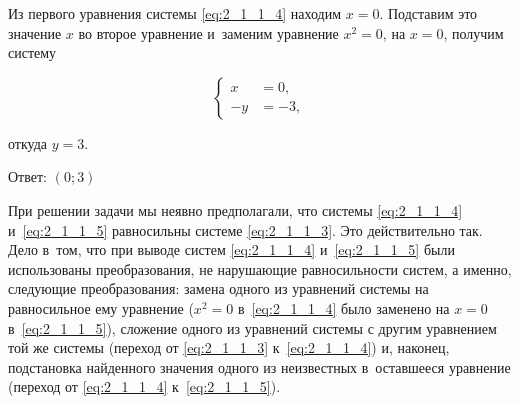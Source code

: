 Из первого уравнения системы \eqref{eq:2_1_1_4} находим $x = 0$.
Подставим это значение $x$ во второе уравнение и~заменим уравнение $x^{2} = 0$,
на $x = 0$, получим систему

\begin{equation}\label{eq:2_1_1_5}
\begin{cases}
x &= 0, \\
-y &= -3,
\end{cases}
\end{equation}

откуда $y = 3$.

Ответ: $(0; 3)$

При решении задачи мы неявно предполагали,
что системы \eqref{eq:2_1_1_4} и~\eqref{eq:2_1_1_5}
равносильны системе \eqref{eq:2_1_1_3}.
Это действительно так. Дело в~том, что при выводе систем
\eqref{eq:2_1_1_4} и~\eqref{eq:2_1_1_5} были использованы преобразования,
не нарушающие равносильности систем, а именно, следующие преобразования:
замена одного из уравнений системы на равносильное ему уравнение ($x^{2} = 0$
в~\eqref{eq:2_1_1_4} было заменено на $x = 0$ в~\eqref{eq:2_1_1_5}),
сложение одного из уравнений системы с другим уравнением той же системы
(переход от \eqref{eq:2_1_1_3} к~\eqref{eq:2_1_1_4}) и, наконец,
подстановка найденного значения одного из неизвестных в~оставшееся
уравнение (переход от \eqref{eq:2_1_1_4} к~\eqref{eq:2_1_1_5}).

